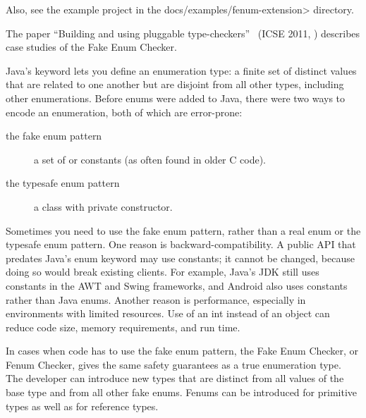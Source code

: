 Also, see the example project in the \<docs/examples/fenum-extension> directory.

The paper ``Building and using pluggable
type-checkers''~\cite{DietlDEMS2011} (ICSE 2011,
)
describes case studies of the Fake Enum Checker.



Java's
\href{https://docs.oracle.com/javase/specs/jls/se17/html/jls-8.html#jls-8.9}{}
keyword lets you define an enumeration type: a finite set of distinct values
that are related to one another but are disjoint from all other
types, including other enumerations.
Before enums were added to Java, there were two ways to encode an
enumeration, both of which are error-prone:

\begin{description}
\item[the fake enum pattern]  a set of  or 
  constants (as often found in older C code).

\item[the typesafe enum pattern]  a class with private constructor.
\end{description}

Sometimes you need to use the fake enum pattern,
rather than a real enum or the typesafe enum pattern.
%
One reason is backward-compatibility.  A public API that predates Java's
enum keyword may use  constants; it cannot be changed, because
doing so would break existing clients.  For example, Java's JDK still uses
 constants in the AWT and Swing frameworks, and Android also uses
 constants rather than Java enums.
%
Another reason is performance, especially in environments with limited
resources.  Use of an int instead of an object can
reduce code size, memory requirements, and run time.

In cases when code has to use the fake enum pattern, the Fake Enum Checker,
or Fenum Checker, gives the same safety guarantees as a true enumeration type.
The developer can introduce new types that are distinct from all values of the
base type and from all other fake enums. Fenums can be introduced for
primitive types as well as for reference types.


